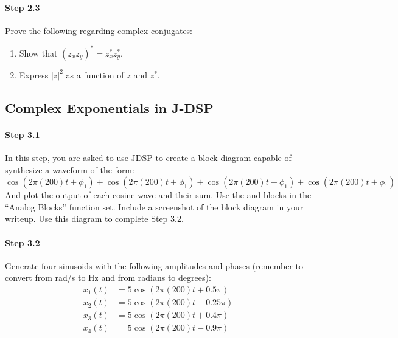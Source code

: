 \paragraph{Step 2.3} Prove the following regarding complex conjugates:

\begin{enumerate}
\item Show that $(z_xz_y)^* = z_x^* z_y^*$.

\item Express $|z|^2$ as a function of $z$ and $z^*$.

\end{enumerate}




\subsection{Complex Exponentials in J-DSP}

\paragraph{Step 3.1} In this step, you are asked to use JDSP
to create a block diagram capable of synthesize a waveform of the form:
$\cos(2\pi (200) t+\phi_1) + \cos(2\pi (200) t +\phi_1) +\cos(2\pi (200) t+\phi_1) +\cos(2\pi (200) t+\phi_1) $
And plot the output of each cosine wave and their sum. Use the  and  blocks in the ``Analog Blocks'' function set. Include a screenshot of the block diagram in your writeup. Use this diagram to complete Step 3.2.


\paragraph{Step 3.2} Generate four sinusoids with the following
amplitudes and phases (remember to convert from rad/s to Hz and from radians to degrees):
\begin{align}
x_1(t) &= 5 \cos(2\pi(200)t +0.5\pi) \\
x_2(t) &= 5 \cos(2\pi(200)t - 0.25\pi) \\
x_3(t) &= 5 \cos(2\pi(200)t +0.4\pi) \\
x_4(t) &= 5 \cos(2\pi(200)t - 0.9\pi) 
\end{align}

